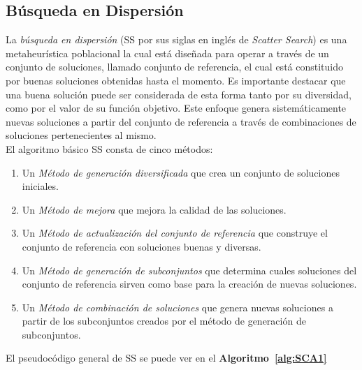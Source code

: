 \subsection{Búsqueda en Dispersión} \label{subsect:sca}

La \emph{búsqueda en dispersión} (SS por sus siglas en inglés de \emph{Scatter Search}) es una metaheurística poblacional la cual está diseñada para operar a través de un conjunto de soluciones, llamado conjunto de referencia, el cual está constituido por buenas soluciones obtenidas hasta el momento. Es importante destacar que una buena so\-lu\-ción puede ser considerada de esta forma tanto por su diversidad, como por el valor de su función objetivo. Este enfoque genera sistemáticamente nuevas soluciones a partir del conjunto de referencia a través de combinaciones de soluciones pertenecientes al mismo.    
\\
El algoritmo básico SS consta de cinco métodos:
\\
\begin{enumerate}
 
\item Un \textit{Método de generación diversificada} que crea un conjunto de soluciones iniciales.

\item Un \textit{Método de mejora} que mejora la calidad de las soluciones.

\item Un \textit{Método de actualización del conjunto de referencia} que construye el conjunto de referencia con soluciones buenas y diversas.

\item Un \textit{Método de generación de subconjuntos} que determina cuales soluciones del conjunto de referencia sirven como base para la creación de nuevas soluciones.

\item Un \textit{Método de combinación de soluciones} que genera nuevas soluciones a partir de los subconjuntos creados por el método de generación de subconjuntos.

\end{enumerate}

El pseudocódigo general de SS se puede ver en el \textbf{Algoritmo~\ref{alg:SCA1}}

